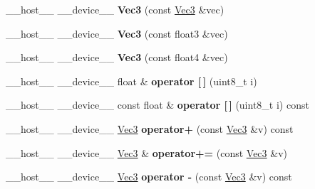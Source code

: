 \begin{DoxyCompactItemize}
\item 
\+\_\+\+\_\+host\+\_\+\+\_\+ \+\_\+\+\_\+device\+\_\+\+\_\+ {\bfseries Vec3} (const \hyperlink{class_vec3}{Vec3} \&vec)\hypertarget{class_vec3_a3b08c22982decc110fb443cad3bc7eac}{}\label{class_vec3_a3b08c22982decc110fb443cad3bc7eac}

\item 
\+\_\+\+\_\+host\+\_\+\+\_\+ \+\_\+\+\_\+device\+\_\+\+\_\+ {\bfseries Vec3} (const float3 \&vec)\hypertarget{class_vec3_a2edb8ba8713360b31ef22fa301681003}{}\label{class_vec3_a2edb8ba8713360b31ef22fa301681003}

\item 
\+\_\+\+\_\+host\+\_\+\+\_\+ \+\_\+\+\_\+device\+\_\+\+\_\+ {\bfseries Vec3} (const float4 \&vec)\hypertarget{class_vec3_aee1b03c9e5b951fb7b5b9171db699057}{}\label{class_vec3_aee1b03c9e5b951fb7b5b9171db699057}

\item 
\+\_\+\+\_\+host\+\_\+\+\_\+ \+\_\+\+\_\+device\+\_\+\+\_\+ float \& {\bfseries operator \mbox{[}$\,$\mbox{]}} (uint8\+\_\+t i)\hypertarget{class_vec3_a13f7dfd7a5bcea529e57f1b7fd1a45f5}{}\label{class_vec3_a13f7dfd7a5bcea529e57f1b7fd1a45f5}

\item 
\+\_\+\+\_\+host\+\_\+\+\_\+ \+\_\+\+\_\+device\+\_\+\+\_\+ const float \& {\bfseries operator \mbox{[}$\,$\mbox{]}} (uint8\+\_\+t i) const\hypertarget{class_vec3_acb50b12a71971b8229a0e81352ef848f}{}\label{class_vec3_acb50b12a71971b8229a0e81352ef848f}

\item 
\+\_\+\+\_\+host\+\_\+\+\_\+ \+\_\+\+\_\+device\+\_\+\+\_\+ \hyperlink{class_vec3}{Vec3} {\bfseries operator+} (const \hyperlink{class_vec3}{Vec3} \&v) const\hypertarget{class_vec3_aa60e8d896fff309c4b0ee1435b6e00bb}{}\label{class_vec3_aa60e8d896fff309c4b0ee1435b6e00bb}

\item 
\+\_\+\+\_\+host\+\_\+\+\_\+ \+\_\+\+\_\+device\+\_\+\+\_\+ \hyperlink{class_vec3}{Vec3} \& {\bfseries operator+=} (const \hyperlink{class_vec3}{Vec3} \&v)\hypertarget{class_vec3_a6f4e538fda1288a1c650407dcaa2e4ad}{}\label{class_vec3_a6f4e538fda1288a1c650407dcaa2e4ad}

\item 
\+\_\+\+\_\+host\+\_\+\+\_\+ \+\_\+\+\_\+device\+\_\+\+\_\+ \hyperlink{class_vec3}{Vec3} {\bfseries operator -\/} (const \hyperlink{class_vec3}{Vec3} \&v) const\hypertarget{class_vec3_aca45728410c7fa3cfc10168e41ab4649}{}\label{class_vec3_aca45728410c7fa3cfc10168e41ab4649}


\end{DoxyCompactItemize}
